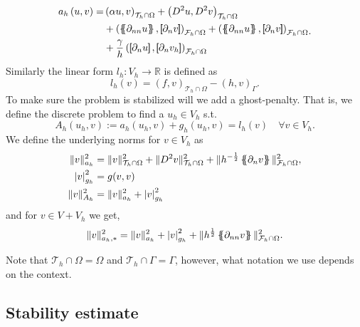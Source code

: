 \begin{equation}
\label{eq:Bi_a_h}
\begin{split}
a_{h} \left( u, v \right)   =&   \left( \alpha  u, v \right) _{\mathcal{T} _{h} \cap \Omega }   +  \left( D^2 u, D^2v \right) _{\mathcal{T} _{h} \cap \Omega} \\
 & +
  \left( \mean{  \partial _{n n} u }, \jump{ \partial _{n }v} \right)_{\mathcal{F}_{h} \cap \Omega}  +
 \left( \mean{ \partial _{n n} u }, \jump{ \partial _{n}v }      \right)_{\mathcal{F}_{h} \cap \Omega}
 \\
 & + \frac{\gamma }{h}  \left( \jump{ \partial _{n} u}, \jump{ \partial _{n} v_{h}   }   \right)_{\mathcal{F}_{h} \cap \Omega} \\
\end{split}
.
\end{equation}
Similarly the linear form $l_{h}:  V_{h} \to \mathbb{R} $ is defined as
 \[
l_{h}( v) =  ( f,v)_{\mathcal{T} _{h} \cap \Omega } - ( h, v) _{\Gamma }  .
\]
To make sure the problem is stabilized will we add a ghost-penalty. That is, we define the discrete problem to find a $u_{h} \in V_{h}$ s.t. \[
A_{h}( u_{h} ,v ) := a_{h}( u_{h}, v)  + g_{h}( u_{h},v) = l_{h} ( v) \quad  \forall v \in  V_{h}.
\]
We define the underlying norms for $ v \in V_{h} $ as
    \begin{align}
        \label{eq:bi_ah_norm}
 \| v \|_{ a_{h} }^{ 2 } & =  \| v \|_{ \mathcal{T} _{h} \cap \Omega  }^{ 2}  + \| D^2 v \|_{\mathcal{T} _{h} \cap \Omega   }^{ 2 } + \| h^{-\frac{1}{2}} \left\{\!\!\left\{ \partial _{n} v \right\}\!\!\right\}   \|_{ \mathcal{F}_{h}\cap \Omega    }^{ 2 },    \\
        \label{eq:bi_gh_norm}
\left\lvert  v  \right\rvert _{g_{h}}^{2} & = g( v,v) \\
        \label{eq:bi_Ah_norm}
\| v \|_{A_{h}  }^{  2}  & = \| v \|_{ a_{h} }^{ 2 } + \left\lvert  v  \right\rvert _{g_{h}}^{2}
    \end{align}
and for $v \in V + V_{h}$ we get, \[
\| v \|_{ a_{h}, * }^{  2} =\| v \|_{ a_{h} }^{ 2 } +\left\lvert  v  \right\rvert _{g_{h}}^{2} +  \| h^{\frac{1}{2}} \left\{\!\!\left\{ \partial _{nn} v \right\}\!\!\right\}   \|_{\mathcal{F} _{h} \cap \Omega   }^{  2}  .
\]
\begin{remark}
Note that $\mathcal{T} _{h} \cap  \Omega   = \Omega  $ and $\mathcal{T} _{h} \cap  \Gamma  = \Gamma $, however, what notation we use depends on the context.
\end{remark}

\subsection{Stability estimate}%
\label{sub:stability_estimate}

